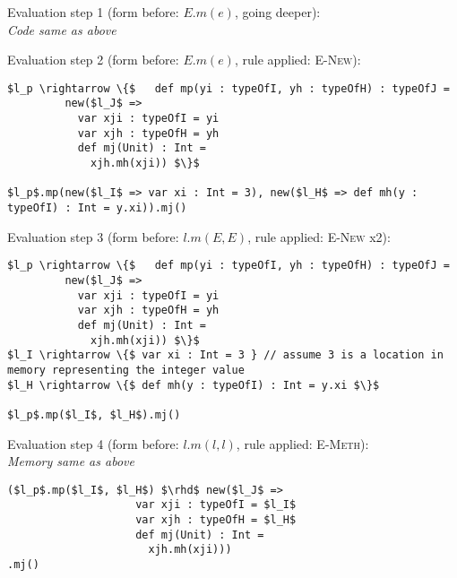 \documentclass{llncs}
\begin{document}
\vspace{12pt}
\noindent Evaluation step 1 (form before: $E.m(e)$, going deeper):\\
\indent\textit{Code same as above}

\vspace{12pt}
\noindent Evaluation step 2 (form before: $E.m(e)$, rule applied: \textsc{E-New}):
\vspace{-6pt}
\begin{lstlisting}[xleftmargin=20pt]
$l_p \rightarrow \{$   def mp(yi : typeOfI, yh : typeOfH) : typeOfJ =
         new($l_J$ =>
           var xji : typeOfI = yi
           var xjh : typeOfH = yh
           def mj(Unit) : Int =
             xjh.mh(xji)) $\}$

$l_p$.mp(new($l_I$ => var xi : Int = 3), new($l_H$ => def mh(y : typeOfI) : Int = y.xi)).mj()
\end{lstlisting}

\vspace{12pt}
\noindent Evaluation step 3 (form before: $l.m(E, E)$, rule applied: \textsc{E-New} x2):
\vspace{-6pt}
\begin{lstlisting}[xleftmargin=20pt]
$l_p \rightarrow \{$   def mp(yi : typeOfI, yh : typeOfH) : typeOfJ =
         new($l_J$ =>
           var xji : typeOfI = yi
           var xjh : typeOfH = yh
           def mj(Unit) : Int =
             xjh.mh(xji)) $\}$
$l_I \rightarrow \{$ var xi : Int = 3 } // assume 3 is a location in memory representing the integer value
$l_H \rightarrow \{$ def mh(y : typeOfI) : Int = y.xi $\}$

$l_p$.mp($l_I$, $l_H$).mj()
\end{lstlisting}

\vspace{12pt}
\noindent Evaluation step 4 (form before: $l.m(l, l)$, rule applied: \textsc{E-Meth}):\\
\vspace{-6pt}
\indent\textit{Memory same as above}\\
\vspace{-6pt}
\begin{lstlisting}[xleftmargin=20pt]
($l_p$.mp($l_I$, $l_H$) $\rhd$ new($l_J$ =>
                    var xji : typeOfI = $l_I$
                    var xjh : typeOfH = $l_H$
                    def mj(Unit) : Int =
                      xjh.mh(xji)))
.mj()
\end{lstlisting}
\end{document}
